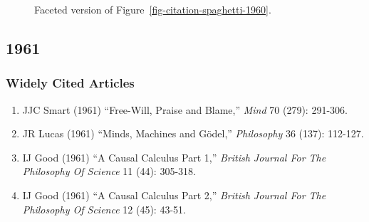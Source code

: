 \documentclass[
  10pt,
  letterpaper,
  DIV=11,
  numbers=noendperiod,
  twoside]{scrartcl}
\providecommand{\tightlist}{%
  \setlength{\itemsep}{0pt}\setlength{\parskip}{0pt}}\usepackage{longtable,booktabs,array}
\begin{document}
\begin{figure}


\caption{\label{fig-citation-facet-1960}Faceted version of
Figure~\ref{fig-citation-spaghetti-1960}.}

\end{figure}%

\newpage

\subsection{1961}\label{sec-s1961}

\subsubsection*{Widely Cited Articles}\label{widely-cited-articles-5}

\begin{enumerate}
\def\labelenumi{\arabic{enumi}.}
\tightlist
\item
  JJC Smart (1961) ``Free-Will, Praise and Blame,'' \emph{Mind} 70
  (279): 291-306.
\item
  JR Lucas (1961) ``Minds, Machines and Gödel,'' \emph{Philosophy} 36
  (137): 112-127.
\item
  IJ Good (1961) ``A Causal Calculus Part 1,'' \emph{British Journal For
  The Philosophy Of Science} 11 (44): 305-318.
\item
  IJ Good (1961) ``A Causal Calculus Part 2,'' \emph{British Journal For
  The Philosophy Of Science} 12 (45): 43-51.
\end{enumerate}
\end{document}
